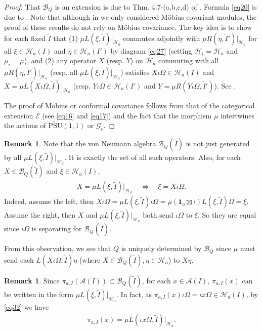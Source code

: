 \documentclass[12pt,a4paper,notitlepage]{article}
\theoremstyle{definition}
\newtheorem{rem}[df]{Remark}
\theoremstyle{plain}
\newcommand{\mc}{\mathcal}
\newcommand{\wtd}{\widetilde}
\newcommand{\id}{\mathbf{1}}
\newcommand{\scr}{\mathscr}
\newcommand{\UPSU}{\widetilde{\mathrm{PSU}}(1,1)}
\newcommand{\Gc}{\mathscr G_c}
\numberwithin{equation}{section}
\begin{document}
\begin{proof}
That $\mc B_Q$ is an extension is due to Thm. 4.7-(a,b,c,d) of \cite{Gui21b}. Formula \eqref{eq20} is due to \cite[Prop. 4.5]{Gui21b}. Note that although in \cite{Gui21b} we only considered M\"obius covariant modules, the proof of these results do not rely on M\"obius covariance. The key idea is to show for each fixed $\wtd I$ that  (1) $\mu L(\xi,\wtd I)|_{\mc H_a}$ commutes adjointly with $\mu R(\eta,\wtd I')|_{\mc H_a}$ for all $\xi\in\mc H_a(I)$ and $\eta\in\mc H_a(I')$ by diagram \eqref{eq27} (setting $\mc H_i=\mc H_a$ and $\mu_i=\mu$), and (2) any operator $X$ (resp. $Y$) on $\mc H_a$ commuting with all $\mu R(\eta,\wtd I')|_{\mc H_a}$ (resp. all $\mu L(\xi,\wtd I)|_{\mc H_a}$) satisfies $X\iota\Omega\in\mc H_a(I)$ and $X=\mu L(X\iota\Omega,\wtd I)|_{\mc H_a}$ (resp. $Y\iota\Omega\in\mc H_a(I')$ and $Y=\mu R(Y\iota\Omega,\wtd I')$). See \cite[Prop. 4.3, 4.5]{Gui21b}.

The proof of M\"obius or conformal covariance follows from that of the categorical extension $\scr E$ (see \eqref{eq16} and \eqref{eq17}) and the fact that the morphism $\mu$ intertwines the actions of $\UPSU$ or $\Gc$. 
\end{proof}

\begin{rem}\label{lb27}
Note that the von Neumann algebra $\mc B_Q(\wtd I)$ is not just generated by all $\mu L(\xi,\wtd I)|_{\mc H_a}$. It is exactly the set of all such operators. Also, for each $X\in\mc B_Q(\wtd I)$ and $\xi\in\mc H_a(I)$, 
\begin{align}
X=\mu L(\xi,\wtd I)|_{\mc H_a}\quad\Leftrightarrow\quad\xi= X\iota\Omega.\label{eq32}	
\end{align}
Indeed, assume the left, then $X\iota\Omega=\mu L(\xi,\wtd I)\iota\Omega=\mu(\id_a\boxtimes\iota)L(\xi,\wtd I)\Omega=\xi$. Assume the right, then $X$ and $\mu L(\xi,\wtd I)|_{\mc H_a}$ both send $\iota\Omega$ to $\xi$. So they are equal since $\iota\Omega$ is separating for $\mc B_Q(\wtd I)$.

From this observation, we see that $Q$ is uniquely determined by $\mc B_Q$ since $\mu$ must send each $L(X\iota\Omega,\wtd I)\eta$ (where $X\in\mc B_Q(\wtd I),\eta\in\mc H_a$) to $X\eta$.
\end{rem}



\begin{rem}
Since $\pi_{a,I}(\mc A(I))\subset\mc B_Q(\wtd I)$, for each $x\in\mc A(I)$, $\pi_{a,I}(x)$ can be written in the form $\mu L(\xi,\wtd I)|_{\mc H_a}$. In fact, as $\pi_{a,I}(x)\iota\Omega=\iota x\Omega\in\mc H_a(I)$, by \eqref{eq32} we have
\begin{align}
	\pi_{a,I}(x)=\mu L(\iota x\Omega,\wtd I)|_{\mc H_a}.\label{eq7}	
\end{align}
\end{rem}
\end{document}
